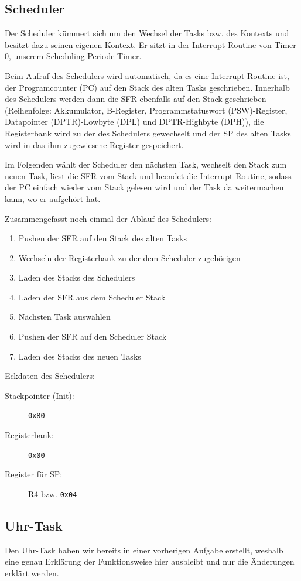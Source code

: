 \subsection{Scheduler}
Der Scheduler kümmert sich um den Wechsel der Tasks bzw. des Kontexts und besitzt dazu seinen eigenen Kontext.
Er sitzt in der Interrupt-Routine von Timer 0, unserem Scheduling-Periode-Timer.

Beim Aufruf des Schedulers wird automatisch, da es eine Interrupt Routine ist, der Programcounter (PC) auf den Stack des alten Tasks geschrieben.
Innerhalb des Schedulers werden dann die SFR ebenfalls auf den Stack geschrieben (Reihenfolge: Akkumulator, B-Register, Programmstatuswort (PSW)-Register, Datapointer (DPTR)-Lowbyte (DPL) und DPTR-Highbyte (DPH)), die Registerbank wird zu der des Schedulers gewechselt und der SP des alten Tasks wird in das ihm zugewiesene Register gespeichert.

Im Folgenden wählt der Scheduler den nächsten Task, wechselt den Stack zum neuen Task, liest die SFR vom Stack und beendet die Interrupt-Routine, sodass der PC einfach wieder vom Stack gelesen wird und der Task da weitermachen kann, wo er aufgehört hat.

Zusammengefasst noch einmal der Ablauf des Schedulers:
\begin{enumerate}
    \item Pushen der SFR auf den Stack des alten Tasks
    \item Wechseln der Registerbank zu der dem Scheduler zugehörigen
    \item Laden des Stacks des Schedulers
    \item Laden der SFR aus dem Scheduler Stack
    \item Nächsten Task auswählen
    \item Pushen der SFR auf den Scheduler Stack
    \item Laden des Stacks des neuen Tasks
\end{enumerate}
Eckdaten des Schedulers:
\begin{description}
    \item[Stackpointer (Init):] \verb|0x80|
    \item[Registerbank:] \verb|0x00|
    \item[Register für SP:] R4 bzw. \verb|0x04|
\end{description}

\subsection{Uhr-Task}
Den Uhr-Task haben wir bereits in einer vorherigen Aufgabe erstellt, weshalb eine genau Erklärung der Funktionsweise hier ausbleibt und nur die Änderungen erklärt werden.

